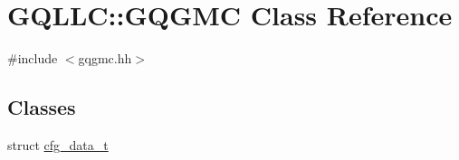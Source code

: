 \hypertarget{class_g_q_l_l_c_1_1_g_q_g_m_c}{\section{\-G\-Q\-L\-L\-C\-:\-:\-G\-Q\-G\-M\-C \-Class \-Reference}
\label{class_g_q_l_l_c_1_1_g_q_g_m_c}
}


{\ttfamily \#include $<$gqgmc.\-hh$>$}

\subsection*{\-Classes}
\begin{DoxyCompactItemize}
\item 
struct \hyperlink{struct_g_q_l_l_c_1_1_g_q_g_m_c_1_1cfg__data__t}{cfg\-\_\-data\-\_\-t}
\end{DoxyCompactItemize}
